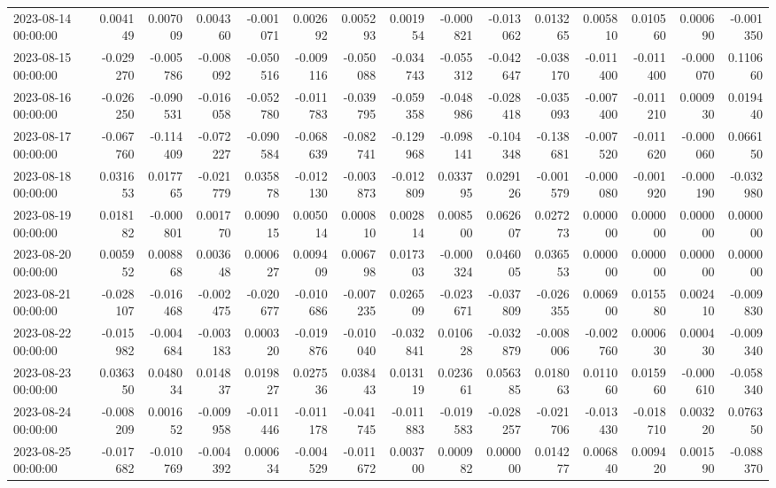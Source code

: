\begin{tabular}{lrrrrrrrrrrrrrr}
2023-08-14 00:00:00 & 0.004149 & 0.007009 & 0.004360 & -0.001071 & 0.002692 & 0.005293 & 0.001954 & -0.000821 & -0.013062 & 0.013265 & 0.005810 & 0.010560 & 0.000690 & -0.001350 \\
2023-08-15 00:00:00 & -0.029270 & -0.005786 & -0.008092 & -0.050516 & -0.009116 & -0.050088 & -0.034743 & -0.055312 & -0.042647 & -0.038170 & -0.011400 & -0.011400 & -0.000070 & 0.110660 \\
2023-08-16 00:00:00 & -0.026250 & -0.090531 & -0.016058 & -0.052780 & -0.011783 & -0.039795 & -0.059358 & -0.048986 & -0.028418 & -0.035093 & -0.007400 & -0.011210 & 0.000930 & 0.019440 \\
2023-08-17 00:00:00 & -0.067760 & -0.114409 & -0.072227 & -0.090584 & -0.068639 & -0.082741 & -0.129968 & -0.098141 & -0.104348 & -0.138681 & -0.007520 & -0.011620 & -0.000060 & 0.066150 \\
2023-08-18 00:00:00 & 0.031653 & 0.017765 & -0.021779 & 0.035878 & -0.012130 & -0.003873 & -0.012809 & 0.033795 & 0.029126 & -0.001579 & -0.000080 & -0.001920 & -0.000190 & -0.032980 \\
2023-08-19 00:00:00 & 0.018182 & -0.000801 & 0.001770 & 0.009015 & 0.005014 & 0.000810 & 0.002814 & 0.008500 & 0.062607 & 0.027273 & 0.000000 & 0.000000 & 0.000000 & 0.000000 \\
2023-08-20 00:00:00 & 0.005952 & 0.008868 & 0.003648 & 0.000627 & 0.009409 & 0.006798 & 0.017303 & -0.000324 & 0.046005 & 0.036553 & 0.000000 & 0.000000 & 0.000000 & 0.000000 \\
2023-08-21 00:00:00 & -0.028107 & -0.016468 & -0.002475 & -0.020677 & -0.010686 & -0.007235 & 0.026509 & -0.023671 & -0.037809 & -0.026355 & 0.006900 & 0.015580 & 0.002410 & -0.009830 \\
2023-08-22 00:00:00 & -0.015982 & -0.004684 & -0.003183 & 0.000320 & -0.019876 & -0.010040 & -0.032841 & 0.010628 & -0.032879 & -0.008006 & -0.002760 & 0.000630 & 0.000430 & -0.009340 \\
2023-08-23 00:00:00 & 0.036350 & 0.048034 & 0.014837 & 0.019827 & 0.027536 & 0.038443 & 0.013119 & 0.023661 & 0.056385 & 0.018063 & 0.011060 & 0.015960 & -0.000610 & -0.058340 \\
2023-08-24 00:00:00 & -0.008209 & 0.001652 & -0.009958 & -0.011446 & -0.011178 & -0.041745 & -0.011883 & -0.019583 & -0.028257 & -0.021706 & -0.013430 & -0.018710 & 0.003220 & 0.076350 \\
2023-08-25 00:00:00 & -0.017682 & -0.010769 & -0.004392 & 0.000634 & -0.004529 & -0.011672 & 0.003700 & 0.000982 & 0.000000 & 0.014277 & 0.006840 & 0.009420 & 0.001590 & -0.088370 \\

\end{tabular}
